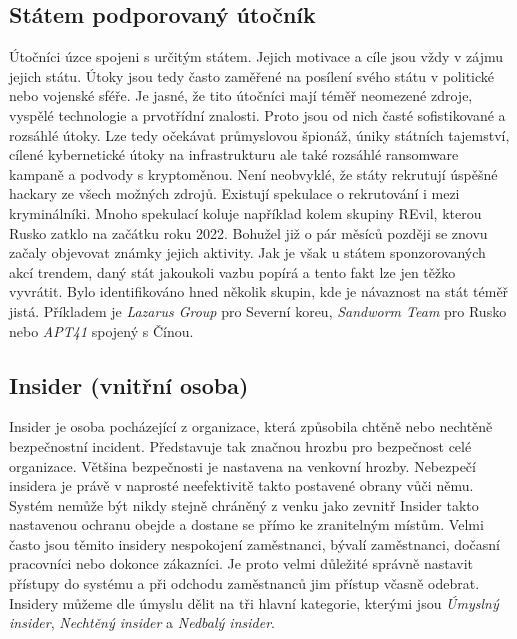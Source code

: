 \subsection{Státem podporovaný útočník}
Útočníci úzce spojeni s určitým státem.
Jejich motivace a cíle jsou vždy v zájmu jejich státu.
Útoky jsou tedy často zaměřené na posílení svého státu v politické nebo vojenské sféře.
Je jasné, že tito útočníci mají téměř neomezené zdroje, vyspělé technologie a prvotřídní znalosti.
Proto jsou od nich časté sofistikované a rozsáhlé útoky.
Lze tedy očekávat průmyslovou špionáž, úniky státních tajemství, cílené kybernetické útoky na infrastrukturu ale také rozsáhlé ransomware kampaně a podvody s kryptoměnou.
Není neobvyklé, že státy rekrutují úspěšné hackary ze všech možných zdrojů.
Existují spekulace o rekrutování i mezi kryminálníki.
Mnoho spekulací koluje například kolem skupiny REvil, kterou Rusko zatklo na začátku roku 2022\cite{REvil_story}.
Bohužel již o pár měsíců později se znovu začaly objevovat známky jejich aktivity.
Jak je však u státem sponzorovaných akcí trendem, daný stát jakoukoli vazbu popírá a tento fakt lze jen těžko vyvrátit.
Bylo identifikováno hned několik skupin, kde je návaznost na stát téměř jistá.
Příkladem je \textit{Lazarus Group} pro Severní koreu, \textit{Sandworm Team} pro Rusko nebo \textit{APT41} spojený s Čínou\cite{Mitre_groups}.

\subsection{Insider (vnitřní osoba)}
Insider je osoba pocházející z organizace, která způsobila chtěně nebo nechtěně bezpečnostní incident.
Představuje tak značnou hrozbu pro bezpečnost celé organizace.
Většina bezpečnosti je nastavena na venkovní hrozby.
Nebezpečí insidera je právě v naprosté neefektivitě takto postavené obrany vůči němu.
Systém nemůže být nikdy stejně chráněný z venku jako zevnitř
Insider takto nastavenou ochranu obejde a dostane se přímo ke zranitelným místům.
Velmi často jsou těmito insidery nespokojení zaměstnanci, bývalí zaměstnanci, dočasní pracovníci nebo dokonce zákazníci.
Je proto velmi důležité správně nastavit přístupy do systému a při odchodu zaměstnanců jim přístup včasně odebrat.
Insidery můžeme dle úmyslu dělit na tři hlavní kategorie, kterými jsou \textit{Úmyslný insider}, \textit{Nechtěný insider} a \textit{Nedbalý insider}.

